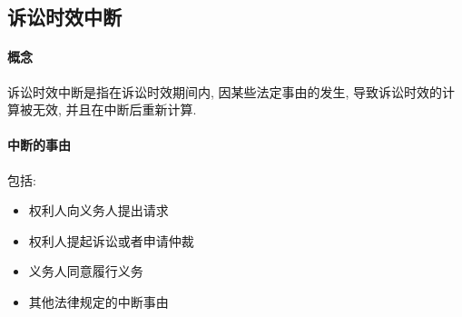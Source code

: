 \subsection{诉讼时效中断}

\paragraph{概念} 诉讼时效中断是指在诉讼时效期间内, 因某些法定事由的发生, 导致诉讼时效的计算被无效, 并且在中断后重新计算.

\paragraph{中断的事由} 包括:

\begin{itemize}
    \item 权利人向义务人提出请求
    \item 权利人提起诉讼或者申请仲裁
    \item 义务人同意履行义务
    \item 其他法律规定的中断事由
\end{itemize}
